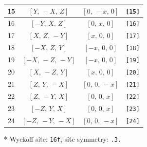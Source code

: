 \documentclass[fleqn,8pt]{jsarticle}
\begin{document}
\begin{longtable}{cccc}
15 & $\left[ Y,\, - X,\, Z \right]$ & $\left[ 0,\, - x,\, 0 \right]$ & {\tt [15]} \\ \hline
16 & $\left[ - Y,\, X,\, Z \right]$ & $\left[ 0,\, x,\, 0 \right]$ & {\tt [16]} \\ \hline
17 & $\left[ X,\, Z,\, - Y \right]$ & $\left[ x,\, 0,\, 0 \right]$ & {\tt [17]} \\ \hline
18 & $\left[ - X,\, Z,\, Y \right]$ & $\left[ - x,\, 0,\, 0 \right]$ & {\tt [18]} \\ \hline
19 & $\left[ - X,\, - Z,\, - Y \right]$ & $\left[ - x,\, 0,\, 0 \right]$ & {\tt [19]} \\ \hline
20 & $\left[ X,\, - Z,\, Y \right]$ & $\left[ x,\, 0,\, 0 \right]$ & {\tt [20]} \\ \hline
21 & $\left[ Z,\, Y,\, - X \right]$ & $\left[ 0,\, 0,\, - x \right]$ & {\tt [21]} \\ \hline
22 & $\left[ Z,\, - Y,\, X \right]$ & $\left[ 0,\, 0,\, x \right]$ & {\tt [22]} \\ \hline
23 & $\left[ - Z,\, Y,\, X \right]$ & $\left[ 0,\, 0,\, x \right]$ & {\tt [23]} \\ \hline
24 & $\left[ - Z,\, - Y,\, - X \right]$ & $\left[ 0,\, 0,\, - x \right]$ & {\tt [24]} \\
\end{longtable}
* Wyckoff site: {\tt 16f}, site symmetry: {\tt .3.}
\renewcommand{\arraystretch}{1.2}
\end{document}
